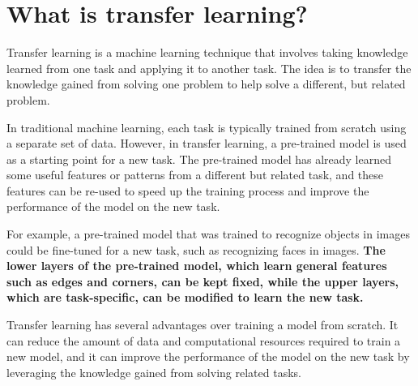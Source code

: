 \documentclass{article}
\begin{document}
\section*{What is transfer learning?}

Transfer learning is a machine learning technique that involves taking knowledge learned from one task and applying it to another task. The idea is to transfer the knowledge gained from solving one problem to help solve a different, but related problem.

In traditional machine learning, each task is typically trained from scratch using a separate set of data. However, in transfer learning, a pre-trained model is used as a starting point for a new task. The pre-trained model has already learned some useful features or patterns from a different but related task, and these features can be re-used to speed up the training process and improve the performance of the model on the new task.

For example, a pre-trained model that was trained to recognize objects in images could be fine-tuned for a new task, such as recognizing faces in images. \textbf{The lower layers of the pre-trained model, which learn general features such as edges and corners, can be kept fixed, while the upper layers, which are task-specific, can be modified to learn the new task.}

Transfer learning has several advantages over training a model from scratch. It can reduce the amount of data and computational resources required to train a new model, and it can improve the performance of the model on the new task by leveraging the knowledge gained from solving related tasks.
\end{document}
